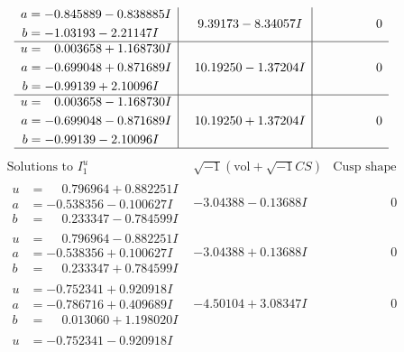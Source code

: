 \documentclass[1p]{elsarticle_modified}
\theoremstyle{definition}
\newcommand{\I}{\sqrt{-1}}
\begin{document}
$$\begin{array}{c|c|c}
\begin{aligned}
a &= -0.845889 - 0.838885 I \\
b &= -1.03193 - 2.21147 I\end{aligned}
 & \phantom{-}9.39173 - 8.34057 I & \phantom{-0.000000 } 0 \\ \hline\begin{aligned}
u &= \phantom{-}0.003658 + 1.168730 I \\
a &= -0.699048 + 0.871689 I \\
b &= -0.99139 + 2.10096 I\end{aligned}
 & \phantom{-}10.19250 - 1.37204 I & \phantom{-0.000000 } 0 \\ \hline\begin{aligned}
u &= \phantom{-}0.003658 - 1.168730 I \\
a &= -0.699048 - 0.871689 I \\
b &= -0.99139 - 2.10096 I\end{aligned}
 & \phantom{-}10.19250 + 1.37204 I & \phantom{-0.000000 } 0\\
 \hline 
 \end{array}$$\newpage$$\begin{array}{c|c|c}  
\text{Solutions to }I^u_{1}& \I (\text{vol} + \sqrt{-1}CS) & \text{Cusp shape}\\
 \hline 
\begin{aligned}
u &= \phantom{-}0.796964 + 0.882251 I \\
a &= -0.538356 - 0.100627 I \\
b &= \phantom{-}0.233347 - 0.784599 I\end{aligned}
 & -3.04388 - 0.13688 I & \phantom{-0.000000 } 0 \\ \hline\begin{aligned}
u &= \phantom{-}0.796964 - 0.882251 I \\
a &= -0.538356 + 0.100627 I \\
b &= \phantom{-}0.233347 + 0.784599 I\end{aligned}
 & -3.04388 + 0.13688 I & \phantom{-0.000000 } 0 \\ \hline\begin{aligned}
u &= -0.752341 + 0.920918 I \\
a &= -0.786716 + 0.409689 I \\
b &= \phantom{-}0.013060 + 1.198020 I\end{aligned}
 & -4.50104 + 3.08347 I & \phantom{-0.000000 } 0 \\ \hline\begin{aligned}
u &= -0.752341 - 0.920918 I \\

\end{aligned}
\end{array}$$
\end{document}

